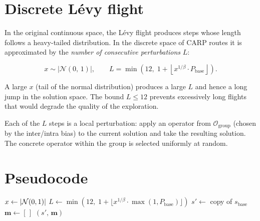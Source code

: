 \documentclass[12pt, a4paper]{article}
\begin{document}
\section{Discrete L\'evy flight}
\label{sec:levy}

In the original continuous space, the L\'evy flight produces steps whose length
follows a heavy-tailed distribution. In the discrete space of CARP routes it is
approximated by the \emph{number of consecutive perturbations} $L$:

\[
x \sim |\mathcal{N}(0,\,1)|, \qquad
L = \min\!\left(12,\; 1 + \left\lfloor x^{1/\beta} \cdot P_{\mathrm{base}} \right\rfloor\right).
\]

A large $x$ (tail of the normal distribution) produces a large $L$ and hence a
long jump in the solution space. The bound $L \leq 12$ prevents excessively
long flights that would degrade the quality of the exploration.

Each of the $L$ steps is a local perturbation: apply an operator from
$\mathcal{O}_{\mathrm{group}}$ (chosen by the inter/intra bias) to the current
solution and take the resulting solution. The concrete operator within the
group is selected uniformly at random.

\section{Pseudocode}

\begin{algorithm}[H]
\DontPrintSemicolon
\caption{DiscreteL\'evyFlight($s_{\mathrm{base}},\, P_{\mathrm{base}},\, \beta,\,
         \mathcal{O}_{\mathrm{group}}$)}
\label{alg:levy}


\BlankLine
$x \leftarrow |{\cal N}(0,1)|$
$L \leftarrow \min\!\left(12,\; 1 + \lfloor x^{1/\beta} \cdot
    \max(1, P_{\mathrm{base}}) \rfloor\right)$
$s' \leftarrow$ copy of $s_{\mathrm{base}}$ \;
$\mathbf{m} \leftarrow [\,]$ \;
\Return $(s',\, \mathbf{m})$
\end{algorithm}
\end{document}
